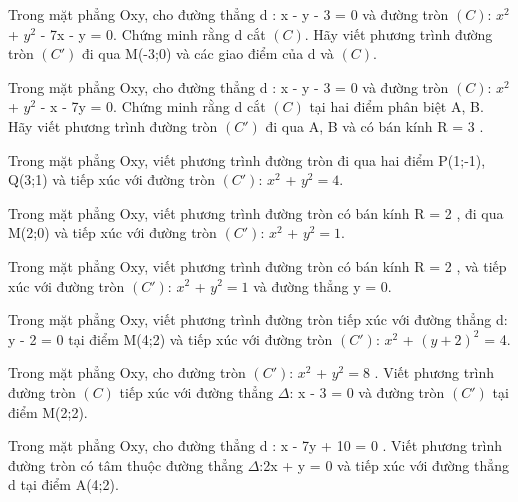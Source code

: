\documentclass[12pt,a4paper]{book}
\begin{document}
\begin{ex}
Trong mặt phẳng Oxy, cho đường thẳng d : x - y - 3 = 0 và đường tròn $(C)$: $x^2$ + $y^2$ - 7x - y = 0. Chứng minh rằng d cắt $(C)$. Hãy viết phương trình đường tròn $(C')$ đi qua M(-3;0) và các giao điểm của d và $(C)$.
\loigiai{}
\end{ex}

\begin{ex}
Trong mặt phẳng Oxy, cho đường thẳng d : x - y - 3 = 0 và đường tròn $(C)$: $x^2$ + $y^2$ - x - 7y = 0. Chứng minh rằng d cắt $(C)$ tại hai điểm phân biệt A, B. Hãy viết phương trình đường tròn $(C')$ đi qua A, B và có bán kính R = 3 .
\loigiai{}
\end{ex}

\begin{ex}
Trong mặt phẳng Oxy, viết phương trình đường tròn đi qua hai điểm P(1;-1), Q(3;1) và tiếp xúc với đường tròn $(C')$: $x^2$ + $y^2 = 4$.
\loigiai{}
\end{ex}

\begin{ex}
Trong mặt phẳng Oxy, viết phương trình đường tròn có bán kính R = 2 , đi qua M(2;0) và tiếp xúc với đường tròn $(C')$: $x^2$ + $y^2 = 1$.
\loigiai{}
\end{ex}

\begin{ex}
Trong mặt phẳng Oxy, viết phương trình đường tròn có bán kính R = 2 , và tiếp xúc với đường tròn $(C')$: $x^2$ + $y^2 = 1$ và đường thẳng y = 0.
\loigiai{}
\end{ex}

\begin{ex}
Trong mặt phẳng Oxy, viết phương trình đường tròn tiếp xúc với đường thẳng d: y - 2 = 0 tại điểm M(4;2) và tiếp xúc với đường tròn $(C')$: $x^2$ + $(y + 2)^2$ = 4.
\loigiai{}
\end{ex}

\begin{ex}
Trong mặt phẳng Oxy, cho đường tròn $(C')$: $x^2$ + $y^2 = 8$ . Viết phương trình đường tròn $(C)$ tiếp xúc với đường thẳng $\Delta$: x - 3 = 0 và đường tròn $(C')$ tại điểm M(2;2).
\loigiai{}
\end{ex}

\begin{ex}
Trong mặt phẳng Oxy, cho đường thẳng d : x - 7y + 10 = 0 . Viết phương trình đường tròn có tâm thuộc đường thẳng $\Delta$:2x + y = 0 và tiếp xúc với đường thẳng d tại điểm A(4;2).
\loigiai{}
\end{ex}
\end{document}
